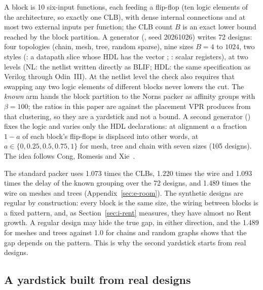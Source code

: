  A block is 10 six-input functions, each feeding a flip-flop (ten logic elements of the  architecture, so exactly one CLB), with dense internal connections and at most two external inputs per function; the CLB count $B$ is an exact lower bound reached by the block partition. A generator (, seed 20261026) writes 72 designs: four topologies (chain, mesh, tree, random sparse), nine sizes $B=4$ to $1024$, two styles (: a datapath slice whose HDL has the vector ; : scalar registers), at two levels (NL: the netlist written directly as BLIF; HDL: the same specification as Verilog through Odin~III). At the netlist level the check also requires that swapping any two logic elements of different blocks never lowers the cut. The \emph{known} arm hands the block partition to the Norns packer as affinity groups with $\beta=100$; the ratios in this paper are against the placement VPR produces from that clustering, so they are a yardstick and not a bound. A second generator () fixes the logic and varies only the HDL declarations: at alignment $a$ a fraction $1-a$ of each block's flip-flops is displaced into other words, at $a\in\{0,0.25,0.5,0.75,1\}$ for mesh, tree and chain with seven sizes (105 designs). The idea follows Cong, Romesis and Xie~\cite{Cong03tpeko}.

 The standard packer uses 1.073 times the CLBs, 1.220 times the wire and 1.093 times the delay of the known grouping over the 72 designs, and 1.489 times the wire on meshes and trees (Appendix~\ref{sec:e-room}). The synthetic designs are regular by construction: every block is the same size, the wiring between blocks is a fixed pattern, and, as Section~\ref{sec:i-rent} measures, they have almost no Rent growth. A regular design may hide the true gap, in either direction, and the 1.489 for meshes and trees against 1.0 for chains and random graphs shows that the gap depends on the pattern. This is why the second yardstick starts from real designs.

\subsection{A yardstick built from real designs}
\label{sec:i-yardstick-real}

